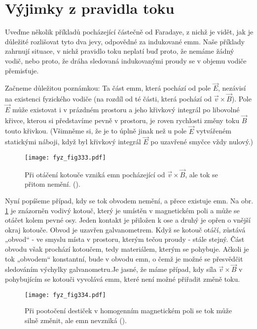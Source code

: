 {\section{Výjimky z pravidla toku}\label{fyz:IIchapXVIIsecII}
  Uveďme několik příkladů pocházející částečně od Faradaye, z nichž je vidět, jak je důležité 
  rozlišovat tyto dva jevy, odpovědné za indukované emm. Naše příklady zahrnují situace, v nichž 
  pravidlo toku neplatí buď proto, že nemáme žádný vodič, nebo proto, že dráha sledovaná 
  indukovanými proudy se v objemu vodiče přemisťuje.

  Začneme důležitou poznámkou: Ta část emm, která pochází od pole \(\vec{E}\), nezávisí na 
  existenci fyzického vodiče (na rozdíl od té části, která pochází od \(\vec{v}\times\vec{B}\)). 
  Pole \(\vec{E}\) může existovat i v prázdném prostoru a jeho křivkový integrál po libovolné 
  křivce, kterou si představíme pevně v prostoru, je roven rychlosti změny toku \(\vec{B}\) touto 
  křivkou. (Všimněme si, že je to úplně jinak než u pole \(\vec{E}\) vytvářeném statickými náboji, 
  když byl křivkový integrál \(\vec{E}\) po uzavřené smyčce vždy nulový.)

  \begin{figure}[ht!]  %
    \centering
    \texttt{[image: fyz\_fig333.pdf]}
    \caption{Při otáčení kotouče vzniká emn pocházející od \(\vec{v}\times\vec{B}\), ale tok se 
             přitom nemění.
             (\cite[s.~296]{Feynman02}).}
    \label{fyz:fig333}
  \end{figure}
  
  Nyní popíšeme případ, kdy se tok obvodem nemění, a přece existuje emn. Na obr. \ref{fyz:fig333} 
  je znázorněn vodivý kotouč, který je umístěn v magnetickém poli a může se otáčet kolem pevné osy. 
  Jeden kontakt je přiložen k ose a druhý je opřen o vnější okraj kotouče. Obvod je uzavřen 
  galvanometrem. Když se kotouč otáčí, zůstává „obvod“ - ve smyslu místa v prostoru, kterým tečou 
  proudy - stále stejný. Část obvodu však prochází kotoučem, tedy materiálem, kterým se pohybuje. 
  Ačkoli je tok „obvodem“ konstantní, bude v obvodu emn, o čemž je možné se přesvědčit sledováním 
  výchylky galvanometru.Je jasné, že máme případ, kdy síla \(\vec{v}\times\vec{B}\) v pohybujícím 
  se kotouči vyvolává emm, které není možné přiřadit změně toku.
  
  \begin{figure}[ht!]  %
    \centering
    \texttt{[image: fyz\_fig334.pdf]}
    \caption{Při pootočení destiček v homogenním magnetickém poli se tok může silně změnit, ale emn
             nevzniká
             (\cite[s.~296]{Feynman02}).}
    \label{fyz:fig334}
  \end{figure}
  
}
